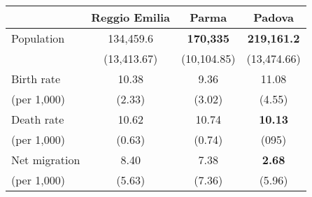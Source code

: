 \begin{tabular}{l c c c}
\toprule
&	Reggio Emilia & Parma & Padova \\
\midrule
Population	& 134,459.6 &   \textbf{170,335} &  \textbf{219,161.2}   \\
			& (13,413.67) & (10,104.85)& (13,474.66)   \\
Birth rate & 		10.38 &9.36  & 	11.08 \\
	(per 1,000)	&		(2.33) & (3.02) & (4.55) \\
Death rate &  10.62 &  10.74 & \textbf{10.13} \\
	(per 1,000)	& (0.63) & (0.74) & (095) \\
Net migration & 8.40 &  7.38 & \textbf{2.68} \\
	(per 1,000)		& (5.63) & (7.36) & (5.96) \\
\bottomrule
\end{tabular}

